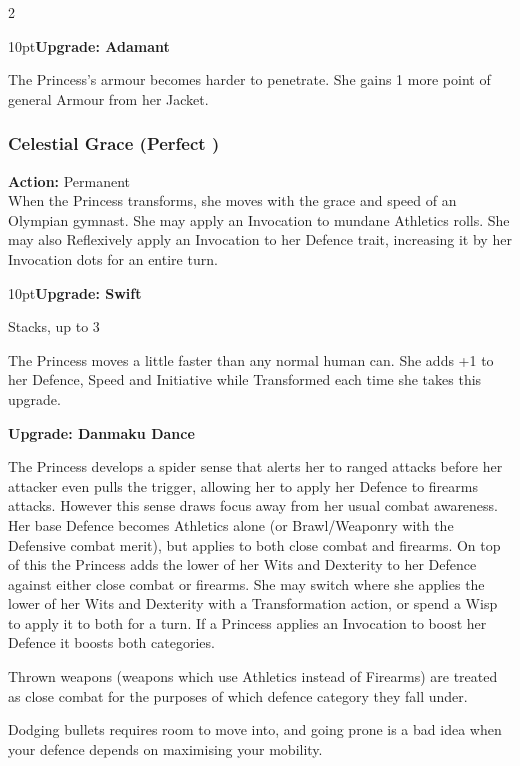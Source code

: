 \begin{multicols}{2}
\begin{myindentpar}{10pt}\textbf{Upgrade: Adamant}

\noindent The Princess's armour becomes harder to penetrate. She gains 1 more point of general Armour from her Jacket. \end{myindentpar}

\subsubsection*{Celestial Grace (Perfect \textbullet)}

\noindent \textbf{Action:} Permanent \\

\noindent When the Princess transforms, she moves with the grace and speed of an Olympian gymnast. She may apply an Invocation to mundane Athletics rolls. She may also Reflexively apply an Invocation to her Defence trait, increasing it by her Invocation dots for an entire turn. 

\begin{myindentpar}{10pt}\textbf{Upgrade: Swift}

Stacks, up to 3

The Princess moves a little faster than any normal human can. She adds +1 to her Defence, Speed and Initiative while Transformed each time she takes this upgrade.

\textbf{Upgrade: Danmaku Dance}

The Princess develops a spider sense that alerts her to ranged attacks before her attacker even pulls the trigger, allowing her to apply her Defence to firearms attacks. However this sense draws focus away from her usual combat awareness. Her base Defence becomes Athletics alone (or Brawl/Weaponry with the Defensive combat merit), but applies to both close combat and firearms. On top of this the Princess adds the lower of her Wits and Dexterity to her Defence against either close combat or firearms. She may switch where she applies the lower of her Wits and Dexterity with a Transformation action, or spend a Wisp to apply it to both for a turn. If a Princess applies an Invocation to boost her Defence it boosts both categories. 

Thrown weapons (weapons which use Athletics instead of Firearms) are treated as close combat for the purposes of which defence category they fall under. 

Dodging bullets requires room to move into, and going prone is a bad idea when your defence depends on maximising your mobility. 


\end{myindentpar}
\end{multicols}
